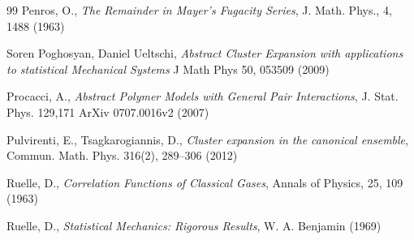 \documentclass[reqno]{amsart}
\numberwithin{equation}{section}
\begin{document}
\begin{thebibliography}{99}
Penros, O.,
{\it The Remainder in Mayer's Fugacity Series},
J. Math. Phys., 4, 1488 (1963)

Soren Poghosyan, Daniel Ueltschi,
{\it Abstract Cluster Expansion with applications to statistical Mechanical Systems}
J Math Phys 50, 053509 (2009)

Procacci, A.,
{\it Abstract Polymer Models with General Pair Interactions},
J. Stat. Phys. 129,171
ArXiv 0707.0016v2 (2007)

Pulvirenti, E., Tsagkarogiannis, D.,
{\it Cluster expansion in the canonical ensemble},
Commun. Math. Phys. 316(2), 289–306 (2012)

Ruelle, D.,
{\it Correlation Functions of Classical Gases},
Annals of Physics, 25, 109 (1963)

Ruelle, D.,
{\it Statistical Mechanics: Rigorous Results},
W. A. Benjamin (1969)

\end{thebibliography}
\end{document}
